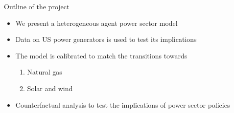 \documentclass{beamer}
\begin{document}

\begin{frame}{Outline of the project}

\begin{itemize}
    \item We present a heterogeneous agent power sector model
    \item Data on US power generators is used to test its implications
    \item The model is calibrated to match the transitions towards
    \begin{enumerate}
        \item Natural gas
        \item Solar and wind
    \end{enumerate}
    \item Counterfactual analysis to test the implications of power sector policies
\end{itemize}

    
\end{frame}
\end{document}
